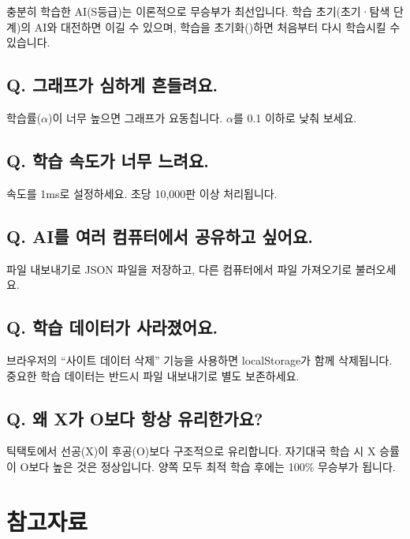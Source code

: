 \documentclass[11pt,a4paper]{article}
\begin{document}
충분히 학습한 AI(S등급)는 이론적으로 무승부가 최선입니다. 학습 초기(초기·탐색 단계)의 AI와 대전하면 이길 수 있으며, 학습을 초기화()하면 처음부터 다시 학습시킬 수 있습니다.

\subsection*{Q. 그래프가 심하게 흔들려요.}

학습률(\(\alpha\))이 너무 높으면 그래프가 요동칩니다. \(\alpha\)를 0.1 이하로 낮춰 보세요.

\subsection*{Q. 학습 속도가 너무 느려요.}

속도를 1ms로 설정하세요. 초당 10,000판 이상 처리됩니다.

\subsection*{Q. AI를 여러 컴퓨터에서 공유하고 싶어요.}

 파일 내보내기로 JSON 파일을 저장하고, 다른 컴퓨터에서  파일 가져오기로 불러오세요.

\subsection*{Q. 학습 데이터가 사라졌어요.}

브라우저의 ``사이트 데이터 삭제'' 기능을 사용하면 localStorage가 함께 삭제됩니다. 중요한 학습 데이터는 반드시  파일 내보내기로 별도 보존하세요.

\subsection*{Q. 왜 X가 O보다 항상 유리한가요?}

틱택토에서 선공(X)이 후공(O)보다 구조적으로 유리합니다. 자기대국 학습 시 X 승률이 O보다 높은 것은 정상입니다. 양쪽 모두 최적 학습 후에는 100\% 무승부가 됩니다.

\newpage
\section*{참고자료}
\end{document}
